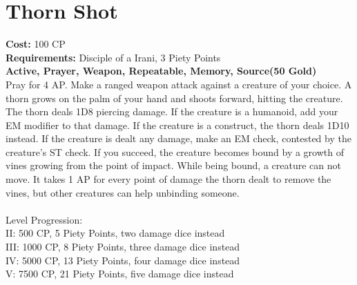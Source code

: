 \section{Thorn Shot}
\textbf{Cost:} 100 CP\\
\textbf{Requirements:} Disciple of a Irani, 3 Piety Points \\
\textbf{Active, Prayer, Weapon, Repeatable, Memory, Source(50 Gold)}\\
Pray for 4 AP. Make a ranged weapon attack against a creature of your choice. A thorn grows on the palm of your hand and shoots forward, hitting the creature. The thorn deals 1D8 piercing damage. If the creature is a humanoid, add your EM modifier to that damage. If the creature is a construct, the thorn deals 1D10 instead. If the creature is dealt any damage, make an EM check, contested by the creature's ST check. If you succeed, the creature becomes bound by a growth of vines growing from the point of impact. While being bound, a creature can not move. It takes 1 AP for every point of damage the thorn dealt to remove the vines, but other creatures can help unbinding someone.\\
\\
Level Progression:\\
II: 500 CP, 5 Piety Points, two damage dice instead\\
III: 1000 CP, 8 Piety Points, three damage dice instead\\
IV: 5000 CP, 13 Piety Points, four damage dice instead\\
V: 7500 CP, 21 Piety Points, five damage dice instead\\